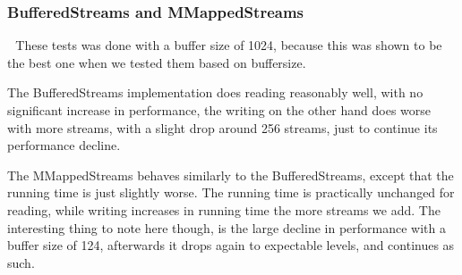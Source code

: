 \subsubsection{BufferedStreams and MMappedStreams}
\includegraphics[width=0.5]{BS.png}
\includegraphics[width=0.5]{MMS.png}
These tests was done with a buffer size of 1024, because this was shown to be the best one when we tested them based on buffersize. 

The BufferedStreams implementation does reading reasonably well, with no significant increase in performance, the writing on the other hand does worse with more streams, with a slight drop around 256 streams, just to continue its performance decline. 

The MMappedStreams behaves similarly to the BufferedStreams, except that the running time is just slightly worse. The running time is practically unchanged for reading, while writing increases in running time the more streams we add. The interesting thing to note here though, is the large decline in performance with a buffer size of 124, afterwards it drops again to expectable levels, and continues as such. 

